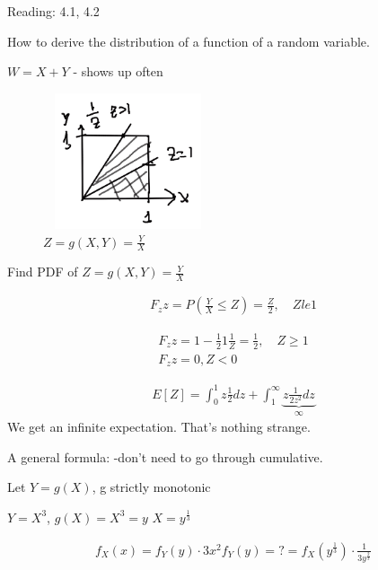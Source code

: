 
Reading: 4.1, 4.2

How to derive the distribution of a function of a random variable.

$W=X+Y$ - shows up often

\begin{figure}[h]
\centering
\includegraphics[width=5cm, height=4cm]{images/L11/derived_dist_z.jpeg}
\caption{$Z=g(X,Y)=\frac{Y}{X}$}
\end{figure}

Find PDF of $Z=g(X,Y)=\frac{Y}{X}$

\begin{align*}
F_z{z}=P \left(\frac{Y}{X} \le Z \right) = \frac{Z}{2},\quad Z le 1
\end{align*}

\begin{align*}
F_z{z}= 1 - \frac{1}{2}1\frac{1}{Z} = \frac{1}{2},\quad Z \ge 1\\
F_z{z}= 0, Z < 0
\end{align*}

\begin{align*}
E[Z] = \int_0^1 z \frac{1}{2}dz + \int_1^{\infty} \underbrace{z \frac{1}{2 z^2}dz}_{\infty}
\end{align*}
We get an infinite expectation.  That's nothing strange.


A general formula: -don't need to go through cumulative.


Let $Y=g(X)$, g strictly monotonic


$Y=X^3$, $g(X)=X^3 = y$
$X=y^\frac{1}{3}$

\begin{align*}
f_X(x)=f_{Y}(y)\cdot 3x^2
f_Y(y)=?
 = f_X(y^\frac{1}{3}) \cdot \frac{1}{3y^\frac{2}{3}}
\end{align*}

